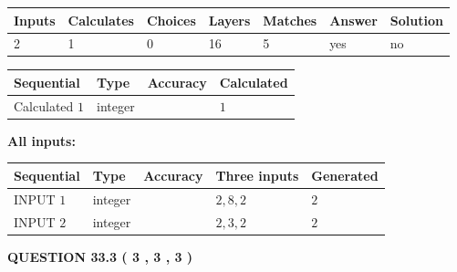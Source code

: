 \documentclass[12pt]{article}
\begin{document}
  
 
 
\noindent{}
 
 
 
   
   
   
   
\noindent\begin{tabular}{|l|l|l|l|l|l|l|}
 \hline
Inputs & Calculates & Choices & Layers & Matches & Answer & Solution \\ \hline
           2  & 
           1  & 
           0
  & 
          16  & 
           5  & 
  yes & 
  no 
  \\ \hline
 \end{tabular}
   
   
   
   
\noindent{}
   
   
  
  
\noindent\begin{tabular}{|l|l|l|l|}
\hline
 Sequential & Type & Accuracy & Calculated \\ 
\hline
 
 
  Calculated $            1 $ & integer &  & 
  $ 1 $ 
 \\  \hline  
 \end{tabular}
   
   
   
   
\noindent\vspace{0.1in}\hspace{-0.08in} {\textbf{\Large{All inputs: }}}
   
   
  
  
\noindent\begin{tabular}{|l|l|l|l|l|}
\hline
 Sequential & Type & Accuracy & Three inputs & Generated \\ 
\hline
 
 
  INPUT $            1 $ & integer &  & $
 2
 , 
 8
 , 
 2
 $ & $ 2 $ 
 \\  \hline  
 
 
  INPUT $            2 $ & integer &  & $
 2
 , 
 3
 , 
 2
 $ & $ 2 $ 
 \\  \hline  
 \end{tabular}
   
   
  
\vspace{0.2in}
  
{\textbf{\Large{QUESTION
33.3 
 (           3 ,           3 ,           3 )
}}}
  
\end{document}

